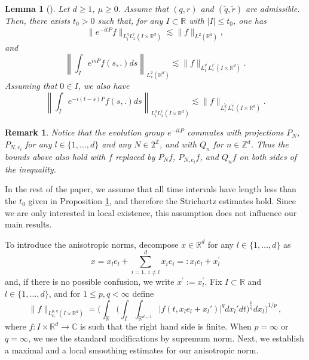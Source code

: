\documentclass[10pt,leqno]{amsart}
\newtheorem{lem}[thm]{Lemma} %
\newtheorem{rmq}[thm]{Remark} %
\newcommand{\R}{\mathbb{R}} %
\numberwithin{equation}{section}
\newcommand{\Z}{\mathbb{Z}}
\begin{document}
\begin{lem}[\cite{MR2787438,MR3852677,MR1151250,MR1646048}]
\label{strichartz}
Let $d\geq 1$, $\mu \geq 0$. Assume that $(q,r)$ and $(\tilde{q},\tilde{r})$ are admissible. Then, there exists $t_0>0$ such that, for any $I\subset \R$ with $|I|\leq t_0$, one has
\begin{equation}
\label{strichartze1}
\|e^{-it P} f\|_{L_t^q L_x^r (I\times \R^d)} \lesssim \|f\|_{L^2 (\R^d )},
\end{equation}
and
$$\left\|\int_I e^{is P  } f(s,.) ds\right\|_{L_x^2 (\R^d)}\lesssim \|f\|_{L_t^{q^\prime} L_x^{r^\prime} (I\times \R^d)}. $$
Assuming that $0\in I$, we also have
\begin{equation}
\label{strichartze3}
\left\|\int_I e^{-i(t-s)P  } f(s,.) ds \right\|_{L_t^q L_x^r (I\times \R^d)}\lesssim \|f\|_{L_t^{\tilde{q}^\prime} L_x^{\tilde{r}^\prime} (I\times \R^d)} . 
\end{equation}
\end{lem}
\begin{rmq}
Notice that the evolution group \(e^{-itP}\) commutes with projections \(P_{N}\), \(P_{N,e_{l}}\) for any \(l\in\{1,\ldots,d\}\) and any \(N\in2^{\Z}\), and with \(Q_{n}\) for \(n\in\Z^{d}\). Thus the bounds above also hold with \(f\) replaced by \(P_{N}f\), \(P_{N,e_{l}}f\), and \(Q_{n}f\) on both sides of the inequality.
\end{rmq}

In the rest of the paper, we assume that all time intervals have length less than the $t_0$ given in Proposition \ref{strichartz}, and therefore the Strichartz estimates hold. 
Since we are only interested in local existence, this assumption does not influence our main results.

 To introduce the anisotropic norms, decompose $x\in \R^d$  for any $l \in \{1, \dots, d\}$ as
$$
x=x_l e_l+\displaystyle\sum_{i=1,\ i\neq l}^d x_i e_i =: x_l e_l + x^\prime_l 
$$
and, if there is no possible confusion, we write $x^\prime := x_l^\prime$.  
Fix $I \subset \R$ and $l \in \{1, \dots, d\}$,  and for $1 \leq p,q<\infty$ define
$$\|f\|_{L_{e_l}^{p,q} (I\times \R^d )} = \Bigg(\int_{\R}  \Bigg(\int_I \int_{\R^{d-1}} |f(t,x_le_{l}+x_l')|^q dx_l' dt\Bigg)^{\frac{p}{q}} dx_l \Bigg)^{1/p} \,,$$
where $f : I \times \R^d \to \mathbb{C}$ is such that the right hand side is finite.
When $p=\infty$ or $q=\infty$, we use the standard modifications by supremum norm. 
Next, we establish a maximal and a local smoothing estimates for our anisotropic norm. 
\end{document}
